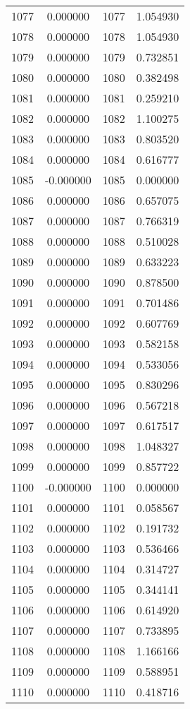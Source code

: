 \documentclass[12pt]{article}
\begin{document}
\begin{longtable}{@{}cccc@{}}
1077 & 0.000000 & 1077 & 1.054930 \\
1078 & 0.000000 & 1078 & 1.054930 \\
1079 & 0.000000 & 1079 & 0.732851 \\
1080 & 0.000000 & 1080 & 0.382498 \\
1081 & 0.000000 & 1081 & 0.259210 \\
1082 & 0.000000 & 1082 & 1.100275 \\
1083 & 0.000000 & 1083 & 0.803520 \\
1084 & 0.000000 & 1084 & 0.616777 \\
1085 & -0.000000 & 1085 & 0.000000 \\
1086 & 0.000000 & 1086 & 0.657075 \\
1087 & 0.000000 & 1087 & 0.766319 \\
1088 & 0.000000 & 1088 & 0.510028 \\
1089 & 0.000000 & 1089 & 0.633223 \\
1090 & 0.000000 & 1090 & 0.878500 \\
1091 & 0.000000 & 1091 & 0.701486 \\
1092 & 0.000000 & 1092 & 0.607769 \\
1093 & 0.000000 & 1093 & 0.582158 \\
1094 & 0.000000 & 1094 & 0.533056 \\
1095 & 0.000000 & 1095 & 0.830296 \\
1096 & 0.000000 & 1096 & 0.567218 \\
1097 & 0.000000 & 1097 & 0.617517 \\
1098 & 0.000000 & 1098 & 1.048327 \\
1099 & 0.000000 & 1099 & 0.857722 \\
1100 & -0.000000 & 1100 & 0.000000 \\
1101 & 0.000000 & 1101 & 0.058567 \\
1102 & 0.000000 & 1102 & 0.191732 \\
1103 & 0.000000 & 1103 & 0.536466 \\
1104 & 0.000000 & 1104 & 0.314727 \\
1105 & 0.000000 & 1105 & 0.344141 \\
1106 & 0.000000 & 1106 & 0.614920 \\
1107 & 0.000000 & 1107 & 0.733895 \\
1108 & 0.000000 & 1108 & 1.166166 \\
1109 & 0.000000 & 1109 & 0.588951 \\
1110 & 0.000000 & 1110 & 0.418716 \\

\end{longtable}
\end{document}
